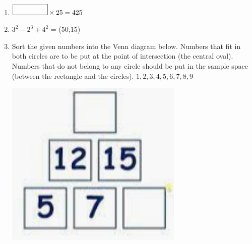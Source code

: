 \documentclass{article}
\begin{document}
\begin{enumerate}
\item \quad \( \framebox(50,15){} \times 25 = 425  \)

\item \quad \( 3^{2} - 2^{3} + 4^{2}  \) = \framebox(50,15){}

\item \quad Sort the given numbers into the Venn diagram below. Numbers that fit in both circles are to be put at the point of intersection (the central oval). Numbers that do not belong to any circle should be put in the sample space (between the rectangle and the circles).\hspace{1cm} \( { 1, 2, 3, 4, 5, 6, 7, 8, 9 } \)
\begin{center}
\includegraphics[width=8.5cm]{Year_6_Mixed_Tests/Homework_Tasks/Addition_pyramid_1.png}
\end{center}


\end{enumerate}




\end{document}
